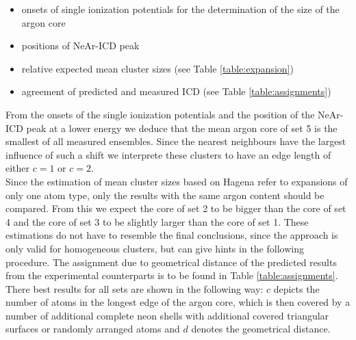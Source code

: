 \begin{itemize}
 \item onsets of single ionization potentials for the determination
       of the size of the argon core
 \item positions of NeAr-ICD peak
 \item relative expected mean cluster sizes (see Table \ref{table:expansion})
 \item agreement of predicted and measured ICD (see Table \ref{table:assignments})
\end{itemize}

From the onsets of the single ionization potentials and the position of the
NeAr-ICD peak at a lower energy we deduce that the mean argon core of set 5
is the smallest of all measured ensembles. Since the nearest neighbours have
the largest influence of such a shift we interprete these clusters to have
an edge length of either $c=1$ or $c=2$.\\
Since the estimation of mean cluster sizes based on Hagena refer to expansions
of only one atom type, only the results with the same argon content should
be compared. From this we expect the core of set 2 to be bigger than the core
of set 4 and the core of set 3 to be slightly larger than the core of set 1.
These estimations do not have to resemble the final conclusions, since the
approach is only valid for homogeneous clusters, but can give hints
in the following procedure. The assignment due to geometrical distance
of the predicted results from the experimental counterparts is to be found in
Table \ref{table:assignments}. There best results for all sets are shown
in the following way: $c$ depicts the number of atoms in the longest edge
of the argon core, which is then covered by a number of additional complete
neon shells with additional covered triangular surfaces or randomly arranged atoms
and $d$ denotes the geometrical distance.\\

